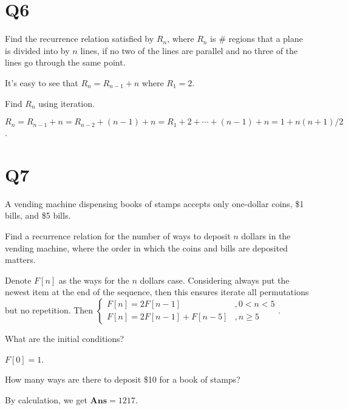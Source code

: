 \documentclass[11pt]{article}
\begin{document}
\section*{Q6}
\begin{qparts}
    
    \item Find the recurrence relation satisﬁed by $R_n$, where $R_n$ is $\#$
    regions that a plane is divided into by $n$ lines, if no two of the
    lines are parallel and no three of the lines go through the same
    point.
    \begin{solution}
        It's easy to see that $R_{n}=R_{n-1}+n$ where $R_1=2$. 
    \end{solution}
    
    \item Find $R_n$ using iteration.
    \begin{solution}
        $R_{n}=R_{n-1}+n=R_{n-2}+(n-1)+n=R_1+2+ \cdots +(n-1)+n=1+n(n+1) / 2$.
    \end{solution}
\end{qparts}

\section*{Q7}
A vending machine dispensing books of stamps accepts only
one-dollar coins, \$1 bills, and \$5 bills.
\begin{qparts}
    
    \item Find a recurrence relation for the number of ways to deposit $n$
    dollars in the vending machine, where the order in which the
    coins and bills are deposited matters.
    \begin{solution}
        Denote $F[n]$ as the ways for the $n$ dollars case.
        Considering always put the newest item at the end of the sequence, then this ensures iterate all permutations but no repetition. Then $
        \begin{cases}
            F[n]=2F[n-1]&,0<n< 5\\
            F[n]=2F[n-1]+F[n-5]&,n\ge 5
        \end{cases}
        $.
    \end{solution}
    
    \item What are the initial conditions?
    \begin{solution}
        $F[0]=1$.
    \end{solution}
    \item How many ways are there to deposit \$10 for a book of stamps?
    \begin{solution}
        By calculation, we get $\textbf{Ans}=1217$.
    \end{solution}
\end{qparts}
\end{document}
